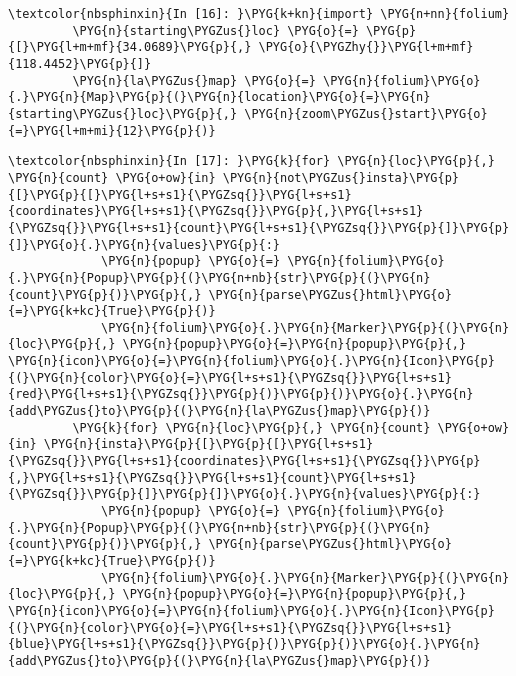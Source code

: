 \documentclass[letterpaper,10pt,english]{sphinxmanual}
\begin{document}
%
\begin{Verbatim}[commandchars=\\\{\}]
\textcolor{nbsphinxin}{In [16]: }\PYG{k+kn}{import} \PYG{n+nn}{folium}
         \PYG{n}{starting\PYGZus{}loc} \PYG{o}{=} \PYG{p}{[}\PYG{l+m+mf}{34.0689}\PYG{p}{,} \PYG{o}{\PYGZhy{}}\PYG{l+m+mf}{118.4452}\PYG{p}{]}
         \PYG{n}{la\PYGZus{}map} \PYG{o}{=} \PYG{n}{folium}\PYG{o}{.}\PYG{n}{Map}\PYG{p}{(}\PYG{n}{location}\PYG{o}{=}\PYG{n}{starting\PYGZus{}loc}\PYG{p}{,} \PYG{n}{zoom\PYGZus{}start}\PYG{o}{=}\PYG{l+m+mi}{12}\PYG{p}{)}
\end{Verbatim}

%
\begin{Verbatim}[commandchars=\\\{\}]
\textcolor{nbsphinxin}{In [17]: }\PYG{k}{for} \PYG{n}{loc}\PYG{p}{,} \PYG{n}{count} \PYG{o+ow}{in} \PYG{n}{not\PYGZus{}insta}\PYG{p}{[}\PYG{p}{[}\PYG{l+s+s1}{\PYGZsq{}}\PYG{l+s+s1}{coordinates}\PYG{l+s+s1}{\PYGZsq{}}\PYG{p}{,}\PYG{l+s+s1}{\PYGZsq{}}\PYG{l+s+s1}{count}\PYG{l+s+s1}{\PYGZsq{}}\PYG{p}{]}\PYG{p}{]}\PYG{o}{.}\PYG{n}{values}\PYG{p}{:}
             \PYG{n}{popup} \PYG{o}{=} \PYG{n}{folium}\PYG{o}{.}\PYG{n}{Popup}\PYG{p}{(}\PYG{n+nb}{str}\PYG{p}{(}\PYG{n}{count}\PYG{p}{)}\PYG{p}{,} \PYG{n}{parse\PYGZus{}html}\PYG{o}{=}\PYG{k+kc}{True}\PYG{p}{)}
             \PYG{n}{folium}\PYG{o}{.}\PYG{n}{Marker}\PYG{p}{(}\PYG{n}{loc}\PYG{p}{,} \PYG{n}{popup}\PYG{o}{=}\PYG{n}{popup}\PYG{p}{,} \PYG{n}{icon}\PYG{o}{=}\PYG{n}{folium}\PYG{o}{.}\PYG{n}{Icon}\PYG{p}{(}\PYG{n}{color}\PYG{o}{=}\PYG{l+s+s1}{\PYGZsq{}}\PYG{l+s+s1}{red}\PYG{l+s+s1}{\PYGZsq{}}\PYG{p}{)}\PYG{p}{)}\PYG{o}{.}\PYG{n}{add\PYGZus{}to}\PYG{p}{(}\PYG{n}{la\PYGZus{}map}\PYG{p}{)}
         \PYG{k}{for} \PYG{n}{loc}\PYG{p}{,} \PYG{n}{count} \PYG{o+ow}{in} \PYG{n}{insta}\PYG{p}{[}\PYG{p}{[}\PYG{l+s+s1}{\PYGZsq{}}\PYG{l+s+s1}{coordinates}\PYG{l+s+s1}{\PYGZsq{}}\PYG{p}{,}\PYG{l+s+s1}{\PYGZsq{}}\PYG{l+s+s1}{count}\PYG{l+s+s1}{\PYGZsq{}}\PYG{p}{]}\PYG{p}{]}\PYG{o}{.}\PYG{n}{values}\PYG{p}{:}
             \PYG{n}{popup} \PYG{o}{=} \PYG{n}{folium}\PYG{o}{.}\PYG{n}{Popup}\PYG{p}{(}\PYG{n+nb}{str}\PYG{p}{(}\PYG{n}{count}\PYG{p}{)}\PYG{p}{,} \PYG{n}{parse\PYGZus{}html}\PYG{o}{=}\PYG{k+kc}{True}\PYG{p}{)}
             \PYG{n}{folium}\PYG{o}{.}\PYG{n}{Marker}\PYG{p}{(}\PYG{n}{loc}\PYG{p}{,} \PYG{n}{popup}\PYG{o}{=}\PYG{n}{popup}\PYG{p}{,} \PYG{n}{icon}\PYG{o}{=}\PYG{n}{folium}\PYG{o}{.}\PYG{n}{Icon}\PYG{p}{(}\PYG{n}{color}\PYG{o}{=}\PYG{l+s+s1}{\PYGZsq{}}\PYG{l+s+s1}{blue}\PYG{l+s+s1}{\PYGZsq{}}\PYG{p}{)}\PYG{p}{)}\PYG{o}{.}\PYG{n}{add\PYGZus{}to}\PYG{p}{(}\PYG{n}{la\PYGZus{}map}\PYG{p}{)}
         
         
\end{Verbatim}
\end{document}
